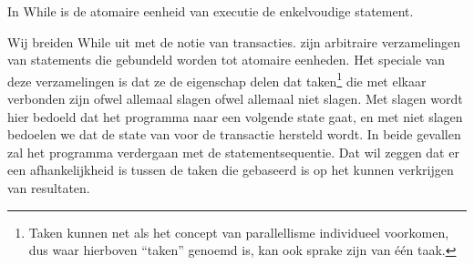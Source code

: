 
In While is de atomaire eenheid van executie de enkelvoudige statement.

Wij breiden While uit met de notie van transacties.  zijn arbitraire verzamelingen van
statements die gebundeld worden tot atomaire eenheden. Het speciale van deze verzamelingen is dat ze de eigenschap delen
dat taken\footnote{Taken kunnen net als het concept van parallellisme individueel voorkomen, dus waar hierboven ``taken''
genoemd is, kan ook sprake zijn van \'e\'en taak.} die met elkaar verbonden zijn ofwel allemaal slagen ofwel allemaal
niet slagen. Met slagen wordt hier bedoeld dat het programma naar een volgende state gaat, en met niet slagen
bedoelen we dat de state van voor de transactie hersteld wordt. In beide gevallen zal het programma verdergaan met de
statementsequentie. Dat wil zeggen dat er een afhankelijkheid is tussen de taken die gebaseerd is op het kunnen
verkrijgen van resultaten.

